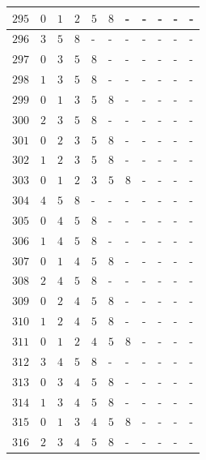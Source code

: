 \begin{appendices}
\begin{table}[H]
\begin{tabular} {|l|l|l|l|l|l|l|l|l|l|l|}
  		$ 295 $ & $ 0 $ &$ 1 $ &$ 2 $ &$ 5 $ &$ 8 $ & - &  - &  - &  - &  -   \\ \hline
  		$ 296 $ & $ 3 $ &$ 5 $ &$ 8 $ & - &  - &  - &  - &  - &  - &  -   \\ \hline
  		$ 297 $ & $ 0 $ &$ 3 $ &$ 5 $ &$ 8 $ & - &  - &  - &  - &  - &  -   \\ \hline
  		$ 298 $ & $ 1 $ &$ 3 $ &$ 5 $ &$ 8 $ & - &  - &  - &  - &  - &  -   \\ \hline
  		$ 299 $ & $ 0 $ &$ 1 $ &$ 3 $ &$ 5 $ &$ 8 $ & - &  - &  - &  - &  -   \\ \hline
  		$ 300 $ & $ 2 $ &$ 3 $ &$ 5 $ &$ 8 $ & - &  - &  - &  - &  - &  -   \\ \hline
  		$ 301 $ & $ 0 $ &$ 2 $ &$ 3 $ &$ 5 $ &$ 8 $ & - &  - &  - &  - &  -   \\ \hline
  		$ 302 $ & $ 1 $ &$ 2 $ &$ 3 $ &$ 5 $ &$ 8 $ & - &  - &  - &  - &  -   \\ \hline
  		$ 303 $ & $ 0 $ &$ 1 $ &$ 2 $ &$ 3 $ &$ 5 $ &$ 8 $ & - &  - &  - &  -   \\ \hline
  		$ 304 $ & $ 4 $ &$ 5 $ &$ 8 $ & - &  - &  - &  - &  - &  - &  -   \\ \hline
  		$ 305 $ & $ 0 $ &$ 4 $ &$ 5 $ &$ 8 $ & - &  - &  - &  - &  - &  -   \\ \hline
  		$ 306 $ & $ 1 $ &$ 4 $ &$ 5 $ &$ 8 $ & - &  - &  - &  - &  - &  -   \\ \hline
  		$ 307 $ & $ 0 $ &$ 1 $ &$ 4 $ &$ 5 $ &$ 8 $ & - &  - &  - &  - &  -   \\ \hline
  		$ 308 $ & $ 2 $ &$ 4 $ &$ 5 $ &$ 8 $ & - &  - &  - &  - &  - &  -   \\ \hline
  		$ 309 $ & $ 0 $ &$ 2 $ &$ 4 $ &$ 5 $ &$ 8 $ & - &  - &  - &  - &  -   \\ \hline
  		$ 310 $ & $ 1 $ &$ 2 $ &$ 4 $ &$ 5 $ &$ 8 $ & - &  - &  - &  - &  -   \\ \hline
  		$ 311 $ & $ 0 $ &$ 1 $ &$ 2 $ &$ 4 $ &$ 5 $ &$ 8 $ & - &  - &  - &  -   \\ \hline
  		$ 312 $ & $ 3 $ &$ 4 $ &$ 5 $ &$ 8 $ & - &  - &  - &  - &  - &  -   \\ \hline
  		$ 313 $ & $ 0 $ &$ 3 $ &$ 4 $ &$ 5 $ &$ 8 $ & - &  - &  - &  - &  -   \\ \hline
  		$ 314 $ & $ 1 $ &$ 3 $ &$ 4 $ &$ 5 $ &$ 8 $ & - &  - &  - &  - &  -   \\ \hline
  		$ 315 $ & $ 0 $ &$ 1 $ &$ 3 $ &$ 4 $ &$ 5 $ &$ 8 $ & - &  - &  - &  -   \\ \hline
  		$ 316 $ & $ 2 $ &$ 3 $ &$ 4 $ &$ 5 $ &$ 8 $ & - &  - &  - &  - &  -   \\ \hline

\end{tabular}
\end{table}
\end{appendices}

